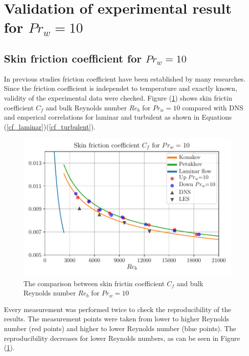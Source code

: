 \documentclass[12pt,oneside]{jbook}
\begin{document}
\section{Validation of experimental result for $Pr_{w}=10$}
\subsection{Skin friction coefficient for $Pr_{w}=10$}
In previous studies friction coefficient have been established by many researches.
Since the friction coefficient is independet to temperature and exactly known, validity of the experimental data were checked.
Figure (\ref{pr10_recf}) shows skin frictin coefficient $C_{f}$ and bulk Reynolds number $Re_{b}$ for $Pr_{w} = 10$ compared with DNS and emperical correlations for laminar and turbulent as shown in Equations (\ref{cf_laminar})(\ref{cf_turbulent}).

\begin{figure}[ht]
	\vspace{0zh}
	\begin{center}
		\includegraphics[width=0.9\linewidth]{fig/pr10_recf.pdf}
		\vspace{-1zh}
		\caption{The comparison between skin frictin coefficient $C_{f}$ and bulk Reynolds number $Re_{b}$ for $Pr_{w} = 10$}
		\label{pr10_recf}
	\end{center}
	\vspace{0zh}
\end{figure}


Every measurement was performed twice to check the reproducibility of the results.
The measurement points were taken from lower to higher Reynolds number (red points) and higher to lower Reynolds number (blue points).
The reproducibility decreases for lower Reynolds numbers, as can be seen in Figure  (\ref{pr10_recf}).
\end{document}
